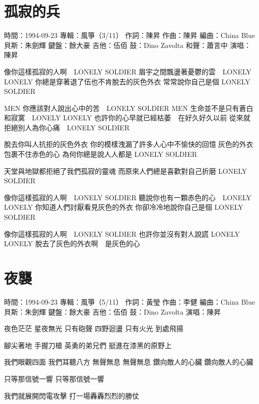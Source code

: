 \documentclass[UTF8,a4paper,oneside,twocolumn,12pt]{ctexbook}
\newcommand{\infopair}[2]{\textbullet #1：#2}
\newcommand{\zc}[1][伍佰]{\infopair{作詞}{#1}}
\newcommand{\zq}[1][伍佰]{\infopair{作曲}{#1}}
\newcommand{\bq}[1][伍佰]{\infopair{編曲}{#1}}
\newcommand{\zj}[1]{\infopair{專輯}{#1}}
\newcommand{\sj}[1]{\infopair{時間}{#1}}
\newenvironment{info}{\begin{flushleft}\kaishu
	}
	{\end{flushleft}\normalsize\yahei\par}
\newenvironment{lyric}{
	}
{}
\begin{document}
\section{孤寂的兵}
\begin{info}%
	\sj{1994-09-23}
	\zj{風箏（3/11）}
	\zc[陳昇]
	\zq[陳昇]
	\bq[China Blue]
	\infopair{貝斯}{朱劍輝}
	\infopair{鍵盤}{餘大豪}
	\infopair{吉他}{伍佰}
	\infopair{鼓}{Dino Zavolta}
	\infopair{和聲}{蕭言中}
	\infopair{演唱}{陳昇}
\end{info}
\begin{lyric}%
	像你這樣孤寂的人啊　LONELY SOLDIER
	眉宇之間飄盪著憂鬱的雲　LONELY LONELY
	你總是穿著退了伍也不肯脫去的灰色外衣
	常常說你自己是個 LONELY SOLDIER

	MEN 你應該對人說出心中的苦　LONELY SOLDIER
	MEN 生命並不是只有蒼白和寂寞　LONELY LONELY
	也許你的心早就已經枯萎　在好久好久以前
	從來就拒絕別人為你心痛　LONELY SOLDIER

	脫去你叫人抗拒的灰色外衣
	你的模樣洩漏了許多人心中不愉快的回憶
	灰色的外衣包裹不住赤色的心
	為何你總是說人人都是 LONELY SOLDIER

	天堂與地獄都拒絕了我們孤寂的靈魂
	而原來人們總是喜歡對自己折磨 LONELY SOLDIER

	像你這樣孤寂的人啊　LONELY SOLDIER
	聽說你也有一顆赤色的心　LONELY LONELY
	你知道人們討厭看見灰色的外衣
	你卻冷冷地說你自己是個 LONELY SOLDIER

	像你這樣孤寂的人啊　LONELY SOLDIER
	也許你並沒有對人說謊 LONELY LONELY
	脫去了灰色的外衣啊　是灰色的心
\end{lyric}

\section{夜襲}
\begin{info}%
	\sj{1994-09-23}
	\zj{風箏（5/11）}
	\zc[黃瑩]
	\zq[李健]
	\bq[China Blue]
	\infopair{貝斯}{朱劍輝}
	\infopair{鍵盤}{餘大豪}
	\infopair{吉他}{伍佰}
	\infopair{鼓}{Dino Zavolta}
	\infopair{演唱}{陳昇}
\end{info}
\begin{lyric}%
	夜色茫茫 星夜無光
	只有砲聲 四野迴盪
	只有火光 到處飛揚

	腳尖著地 手握刀槍
	英勇的弟兄們 挺進在漆黑的原野上

	我們眼觀四面 我們耳聽八方
	無聲無息 無聲無息
	鑽向敵人的心臟 鑽向敵人的心臟

	只等那信號一響
	只等那信號一響

	我們就展開閃電攻擊
	打一場轟轟烈烈的勝仗
\end{lyric}
\end{document}
